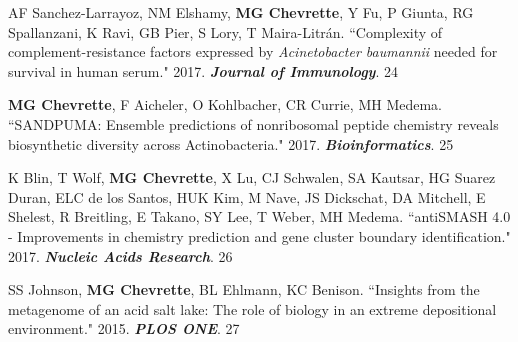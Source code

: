 \begin{cvpubs}
\cvpub
{AF Sanchez-Larrayoz, NM Elshamy, \textbf{MG Chevrette}, Y Fu, P Giunta, RG Spallanzani, K Ravi, GB Pier, S Lory, T Maira-Litr\'{a}n. ``Complexity of complement-resistance factors expressed by \textit{Acinetobacter baumannii} needed for survival in human serum." 2017. \textit{\textbf{Journal of Immunology}}. \textbf{\textit{}}}
{24}

\cvpub
{\textbf{MG Chevrette}, F Aicheler, O Kohlbacher, CR Currie, MH Medema. ``SANDPUMA: Ensemble predictions of nonribosomal peptide chemistry reveals biosynthetic diversity across Actinobacteria." 2017. \textit{\textbf{Bioinformatics}}. \textbf{\textit{}}}
{25}

\cvpub
{K Blin, T Wolf, \textbf{MG Chevrette}, X Lu, CJ Schwalen, SA Kautsar, HG Suarez Duran, ELC de los Santos, HUK Kim, M Nave, JS Dickschat, DA Mitchell, E Shelest, R Breitling, E Takano, SY Lee, T Weber, MH Medema. ``antiSMASH 4.0 - Improvements in chemistry prediction and gene cluster boundary identification." 2017. \textit{\textbf{Nucleic Acids Research}}. \textbf{\textit{}}}
{26}

\cvpub
{SS Johnson, \textbf{MG Chevrette}, BL Ehlmann, KC Benison. ``Insights from the metagenome of an acid salt lake: The role of biology in an extreme depositional environment."  2015. \textit{\textbf{PLOS ONE}}. \textbf{\textit{}}}
{27}

\end{cvpubs}


 \vspace{-2mm}


